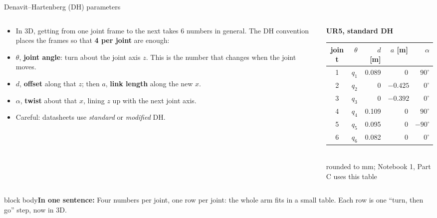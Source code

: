 \documentclass[aspectratio=169]{beamer}
\newcommand{\takeaway}[1]{\vspace{2mm}\begin{beamercolorbox}[rounded=true,sep=4pt,wd=\textwidth]{block body}\footnotesize\textbf{In one sentence:} #1\end{beamercolorbox}}
\begin{document}
\begin{frame}{Denavit--Hartenberg (DH) parameters}
	\begin{columns}[T]
		\begin{column}{0.52\textwidth}
			\begin{itemize}\footnotesize
				\item In 3D, getting from one joint frame to the next takes 6 numbers in general. The DH convention places the frames so that \textbf{4 per joint} are enough:
				\item $\theta$, \textbf{joint angle}: turn about the joint axis $z$. This is the number that changes when the joint moves.
				\item $d$, \textbf{offset} along that $z$; then $a$, \textbf{link length} along the new $x$.
				\item $\alpha$, \textbf{twist} about that $x$, lining $z$ up with the next joint axis.
				\item Careful: datasheets use \emph{standard} or \emph{modified} DH.
			\end{itemize}
		\end{column}
		\begin{column}{0.44\textwidth}
			\centering\scriptsize
			\textbf{UR5, standard DH}\\[1mm]
			\begin{tabular}{crrrr}
				\toprule
				joint & $\theta$ & $d$ [m] & $a$ [m] & $\alpha$ \\
				\midrule
				1 & $q_1$ & 0.089 & 0 & $90^\circ$ \\
				2 & $q_2$ & 0 & $-0.425$ & $0^\circ$ \\
				3 & $q_3$ & 0 & $-0.392$ & $0^\circ$ \\
				4 & $q_4$ & 0.109 & 0 & $90^\circ$ \\
				5 & $q_5$ & 0.095 & 0 & $-90^\circ$ \\
				6 & $q_6$ & 0.082 & 0 & $0^\circ$ \\
				\bottomrule
			\end{tabular}\\[1mm]
			rounded to mm; Notebook 1, Part C uses this table
		\end{column}
	\end{columns}
	\takeaway{Four numbers per joint, one row per joint: the whole arm fits in a small table. Each row is one ``turn, then go'' step, now in 3D.}
\end{frame}
\end{document}
